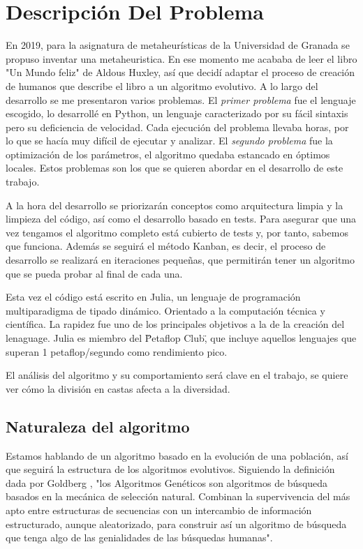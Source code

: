 \chapter{Descripción Del Problema}

En 2019, para la asignatura de metaheurísticas de la Universidad de Granada \cite{merelo molina_2021} se propuso inventar una metaheuristica. En
ese momento me acababa de leer el libro "Un Mundo feliz" de Aldous Huxley, así que decidí adaptar el proceso de creación 
de humanos que describe el libro a un algoritmo evolutivo. A lo largo del desarrollo se me presentaron varios problemas. El
\textit{primer problema} fue el lenguaje escogido, lo desarrollé en Python, un lenguaje caracterizado por su fácil sintaxis pero su deficiencia de
velocidad. Cada ejecución del problema llevaba horas, por lo que se hacía muy difícil de ejecutar y analizar. El
\textit{segundo problema} fue la optimización de los parámetros, el algoritmo quedaba estancado en óptimos locales. Estos problemas son 
los que se quieren abordar en el desarrollo de este trabajo.

A la hora del desarrollo se priorizarán conceptos como arquitectura limpia \cite{cleanArquitecture2017} y la limpieza del
código, así como el desarrollo basado en tests. Para asegurar que una vez tengamos el algoritmo completo está cubierto de tests y, por tanto, sabemos que funciona. Además
se seguirá el método Kanban, es decir, el proceso de desarrollo se realizará en iteraciones pequeñas, que permitirán tener un algoritmo que se pueda probar
al final de cada una. 

Esta vez el código está escrito en Julia, un lenguaje de programación multiparadigma de tipado dinámico. Orientado a la computación técnica y 
científica. La rapidez fue uno de los principales objetivos a la de la creación del lenaguage. Julia es miembro del \"Petaflop Club\", que incluye 
aquellos lenguajes que superan 1 petaflop/segundo como rendimiento pico. 

El análisis del algoritmo y su comportamiento será clave en el trabajo, se quiere ver cómo la división en castas afecta a la diversidad.

\section{Naturaleza del algoritmo}

Estamos hablando de un algoritmo basado en la evolución de una población, así que seguirá la estructura de los
algoritmos evolutivos. Siguiendo la definición dada por Goldberg \cite{goldberg89}, "los Algoritmos Genéticos son algoritmos de búsqueda
basados en la mecánica de selección natural. Combinan la supervivencia del más apto entre estructuras de secuencias con un intercambio de 
información estructurado, aunque aleatorizado, para construir así un algoritmo
de búsqueda que tenga algo de las genialidades de las búsquedas humanas".

